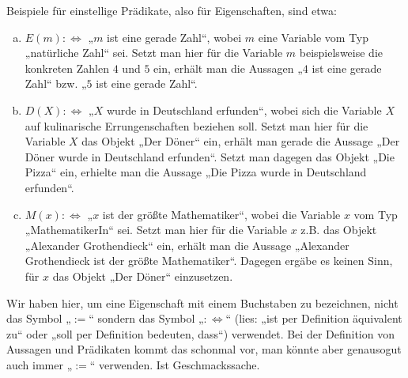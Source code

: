\begin{bsp}
Beispiele für einstellige Prädikate, also für Eigenschaften, sind etwa:
 \begin{enumerate}[a)]
  \item $E(m):\Leftrightarrow$ „$m$ ist eine gerade Zahl“, wobei $m$ eine Variable vom Typ „natürliche Zahl“ sei. Setzt man hier für die Variable $m$ beispielsweise die konkreten Zahlen $4$ und $5$ ein, erhält man die Aussagen „$4$ ist eine gerade Zahl“ bzw. „$5$ ist eine gerade Zahl“.
  \item $D(X):\Leftrightarrow$ „$X$ wurde in Deutschland erfunden“, wobei sich die Variable $X$ auf kulinarische Errungenschaften beziehen soll. Setzt man hier für die Variable $X$ das Objekt „Der Döner“ ein, erhält man gerade die Aussage „Der Döner wurde in Deutschland erfunden“. Setzt man dagegen das Objekt „Die Pizza“ ein, erhielte man die Aussage „Die Pizza wurde in Deutschland erfunden“.
  \item $M(x):\Leftrightarrow $ „$x$ ist der größte Mathematiker“, wobei die Variable $x$ vom Typ „MathematikerIn“ sei. Setzt man hier für die Variable $x$ z.B. das Objekt „Alexander Grothendieck“ ein, erhält man die Aussage „Alexander Grothendieck ist der größte Mathematiker“. Dagegen ergäbe es keinen Sinn, für $x$ das Objekt „Der Döner“ einzusetzen.
 \end{enumerate}
 Wir haben hier, um eine Eigenschaft mit einem Buchstaben zu bezeichnen, nicht das Symbol „$:=$“ sondern das Symbol „$:\Leftrightarrow$“ (lies: „ist per Definition äquivalent zu“ oder „soll per Definition bedeuten, dass“) verwendet. Bei der Definition von Aussagen und Prädikaten kommt das schonmal vor, man könnte aber genausogut auch immer „$:=$“ verwenden. Ist Geschmackssache.
\end{bsp}





